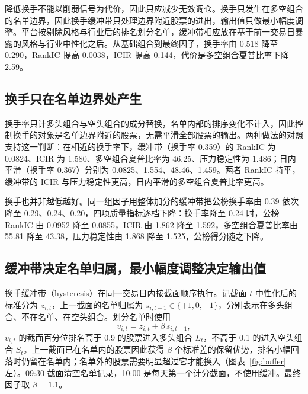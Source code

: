 \documentclass[UTF8,a4paper,zihao=-4,fontset=none]{ctexart}
\begin{document}
降低换手不能以削弱信号为代价，因此只应减少无效调仓。换手只发生在多空组合的名单边界，因此换手缓冲带只处理边界附近股票的进出，输出值只做最小幅度调整。平台按剔除风格与行业后的排名划分名单，缓冲带相应放在基于前一交易日暴露的风格与行业中性化之后。从基础组合到最终因子，换手率由 0.518 降至 0.290，RankIC 提高 0.0038，ICIR 提高 0.144，代价是多空组合夏普比率下降 2.59。

\subsection{换手只在名单边界处产生}\label{sec:boundary}

换手率只计多头组合与空头组合的成分替换，名单内部的排序变化不计入，因此控制换手的对象是名单边界附近的股票，无需平滑全部股票的输出。两种做法的对照支持这一判断：在相近的换手率下，缓冲带（换手率 0.359）的 RankIC 为 0.0824、ICIR 为 1.580、多空组合夏普比率为 46.25、压力稳定性为 1.486；日内平滑（换手率 0.367）分别为 0.0825、1.554、48.46、1.459。两者 RankIC 持平，缓冲带的 ICIR 与压力稳定性更高，日内平滑的多空组合夏普比率更高。

换手也并非越低越好。同一组因子用整体加分的缓冲带把公榜换手率由 0.39 依次降至 0.29、0.24、0.20，四项质量指标逐档下降：换手率降至 0.24 时，公榜 RankIC 由 0.0952 降至 0.0855，ICIR 由 1.862 降至 1.592，多空组合夏普比率由 55.81 降至 43.38，压力稳定性由 1.868 降至 1.525，公榜得分随之下降。

\subsection{缓冲带决定名单归属，最小幅度调整决定输出值}\label{sec:buffer}

换手缓冲带（hysteresis）在同一交易日内按截面顺序执行。记截面 $t$ 中性化后的标准分为 $z_{i,t}$，上一截面的名单归属为 $s_{i,t-1}\in\{+1,0,-1\}$，分别表示在多头组合、不在名单、在空头组合。划分名单时使用
\begin{equation}
v_{i,t}=z_{i,t}+\beta\, s_{i,t-1},
\end{equation}
$v_{i,t}$ 的截面百分位排名高于 0.9 的股票进入多头组合 $L_t$，不高于 0.1 的进入空头组合 $S_t$。上一截面已在名单内的股票因此获得 $\beta$ 个标准差的保留优势，排名小幅回落时仍留在名单内；名单外的股票需要明显超过它才能换入（图表~\ref{fig:buffer} 左）。09:30 截面清空名单记录，10:00 是每天第一个计分截面，不使用缓冲。最终因子取 $\beta=1.1$。
\end{document}

